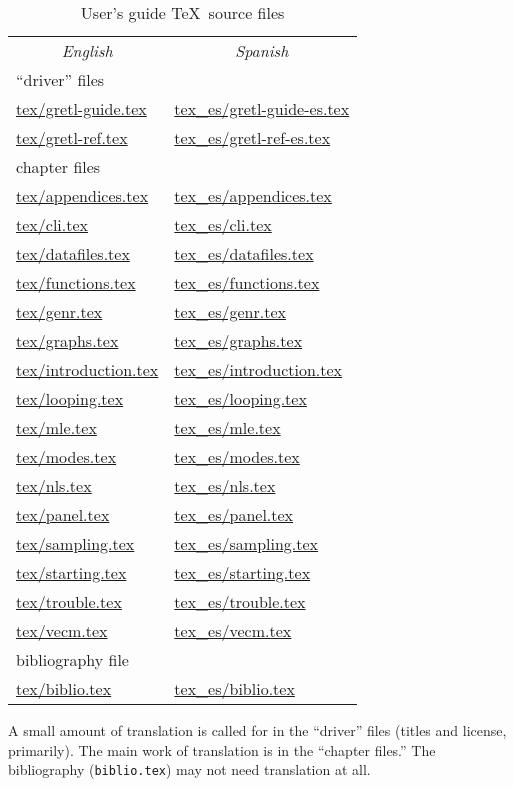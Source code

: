 \documentclass{article}
\begin{document}
\begin{table}[htbp]
\begin{center}
\begin{tabular}{ll}
\multicolumn{1}{c}{\textit{English}} & 
\multicolumn{1}{c}{\textit{Spanish}} \\[6pt]
\multicolumn{2}{l}{``driver'' files} \\
\url{tex/gretl-guide.tex} & \url{tex_es/gretl-guide-es.tex} \\
\url{tex/gretl-ref.tex} & \url{tex_es/gretl-ref-es.tex} \\[6pt]
\multicolumn{2}{l}{chapter files} \\
\url{tex/appendices.tex} & \url{tex_es/appendices.tex} \\
\url{tex/cli.tex} & \url{tex_es/cli.tex} \\
\url{tex/datafiles.tex} & \url{tex_es/datafiles.tex} \\
\url{tex/functions.tex} & \url{tex_es/functions.tex} \\
\url{tex/genr.tex} & \url{tex_es/genr.tex} \\
\url{tex/graphs.tex} & \url{tex_es/graphs.tex} \\
\url{tex/introduction.tex} & \url{tex_es/introduction.tex} \\
\url{tex/looping.tex} & \url{tex_es/looping.tex} \\
\url{tex/mle.tex} & \url{tex_es/mle.tex} \\
\url{tex/modes.tex} & \url{tex_es/modes.tex} \\
\url{tex/nls.tex} & \url{tex_es/nls.tex} \\
\url{tex/panel.tex} & \url{tex_es/panel.tex} \\
\url{tex/sampling.tex} & \url{tex_es/sampling.tex} \\
\url{tex/starting.tex} & \url{tex_es/starting.tex} \\
\url{tex/trouble.tex} & \url{tex_es/trouble.tex} \\
\url{tex/vecm.tex} & \url{tex_es/vecm.tex} \\[6pt]
\multicolumn{2}{l}{bibliography file} \\
\url{tex/biblio.tex} & \url{tex_es/biblio.tex} \\
\end{tabular}
\end{center}
\caption{User's guide \TeX\ source files}
\label{guide-files}
\end{table}

A small amount of translation is called for in the ``driver'' files
(titles and license, primarily).  The main work of translation is in
the ``chapter files.''  The bibliography (\texttt{biblio.tex}) may not
need translation at all.
\end{document}
